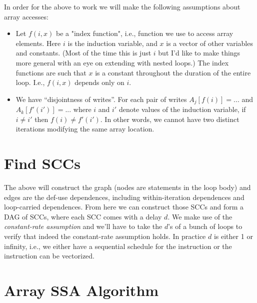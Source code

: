 \documentclass{article}
\begin{document}
In order for the above to work we will make the following assumptions about array accesses:

\begin{itemize}

\item Let $f(i,x)$ be a "index function", i.e., function we use to access array elements. Here $i$ is the induction variable, and $x$ is a vector of other variables and constants. (Most of the time this is just $i$ but I'd like to make things more general with an eye on extending with nested loops.) The index functions are such that $x$ is a constant throughout the duration of the entire loop. I.e., $f(i,x)$ depends only on $i$. 

\item We have ``disjointness of writes''. For each pair of writes $A_j[f(i)] = ... $ and $A_k[f'(i')] = ... $ where $i$ and $i'$ denote values of the induction variable, if $i \neq i'$ then $f(i) \neq f'(i')$. In other words, we cannot have two distinct iterations modifying the same array location.

\end{itemize}

\section{Find SCCs}

The above will construct the graph (nodes are statements in the loop body) and edges are the def-use dependences, including within-iteration dependences and loop-carried dependences. From here we can construct those SCCs and form a DAG of SCCs, where each SCC comes with a delay $d$. We make use of the \emph{constant-rate assumption} and we'll have to take the $d$'s of a bunch of loops to verify that indeed the constant-rate assumption holds. In practice $d$ is either 1 or infinity, i.e., we either have a sequential schedule for the instruction or the instruction can be vectorized. 

\section{Array SSA Algorithm}
\end{document}
